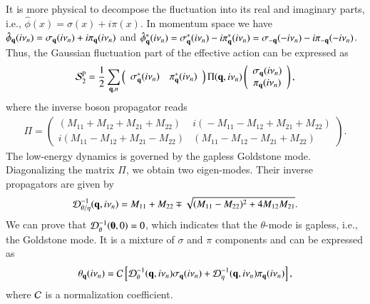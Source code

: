 \documentclass[aps,prd,amsmath,two column,nofootinbib,amssymb,referee]{revtex4}
\begin{document}
It is more physical to decompose the fluctuation into its real and imaginary parts, i.e., $\hat\phi(x)=\sigma(x)+i\pi(x)$. In momentum space we have
$\hat\phi_{\bf q}(i\nu_n) =\sigma_{\bf q}(i\nu_n)+i\pi_{\bf q}(i\nu_n)$ and $\hat\phi_{\bf q}^*(i\nu_n) =\sigma_{\bf q}^*(i\nu_n)-i\pi_{\bf q}^*(i\nu_n)=\sigma_{\bf -q}(-i\nu_n)-i\pi_{\bf -q}(-i\nu_n)$. Thus, the Gaussian fluctuation part of the effective action can be expressed as
\begin{eqnarray}
{\cal S}_2^{\rm p}={1\over2}\sum_{{\bf q},n}\left(\begin{array}{cc}\sigma_{\bf q}^*(i\nu_n)&\pi_{\bf q}^*(i\nu_n)\end{array}\right)\Pi({\bf q},i\nu_n)\left(\begin{array}{c}\sigma_{\bf q}(i\nu_n)\\ \pi_{\bf q}(i\nu_n)\end{array}\right),
\end{eqnarray}
where the inverse boson propagator reads
\begin{eqnarray}
\Pi\!=\!\left(\begin{array}{cc}
\!\!(M_{11}\!+\!M_{12}\!+\!M_{21}\!+\!M_{22})\!&\!\!i(\!-\!M_{11}\!-\!M_{12}\!+\!M_{21}\!+\!M_{22})\!\!\!\\
\!\!i(M_{11}\!-\!M_{12}\!+\!M_{21}\!-\!M_{22})\!&\!\!(M_{11}\!-\!M_{12}\!-\!M_{21}\!+\!M_{22})\!\!\!
\end{array}\right).
\end{eqnarray}
The low-energy dynamics is governed by the gapless Goldstone mode. Diagonalizing the matrix $\Pi$, we obtain two eigen-modes. Their inverse propagators are given by
\begin{eqnarray}
{\cal D}_{\theta/\eta}^{-1}({\bf q},i\nu_n)=M_{11}+M_{22}\mp\sqrt{(M_{11}-M_{22})^2+4M_{12}M_{21}}.
\end{eqnarray}
We can prove that ${\cal D}_{\theta}^{-1}({\bf 0},0)=0$, which indicates that the $\theta$-mode is  gapless, i.e., the Goldstone mode. It is a mixture of $\sigma$ and $\pi$ components and can be expressed as
\begin{eqnarray}
\theta_{\bf q}(i\nu_n)={\cal C}\left[{\cal D}_{\theta}^{-1}({\bf q},i\nu_n)\sigma_{\bf q}(i\nu_n)+{\cal D}_{\eta}^{-1}({\bf q},i\nu_n)\pi_{\bf q}(i\nu_n)\right],
\end{eqnarray}
where ${\cal C}$ is a normalization coefficient.
\end{document}
